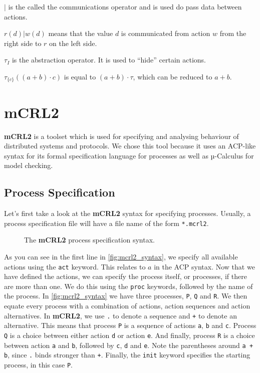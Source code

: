\documentclass{clseminar}
\begin{document}
  $|$ is the called the communications operator and is used do pass data between actions.
  \\
  \begin{example}
     $r(d) | w(d)$ means that the value $d$ is communicated from action $w$ from the right side to $r$ on the left side.
  \end{example}

  $\tau_I$ is the abstraction operator. It is used to “hide” certain actions.
  \\
  \begin{example}
    $\tau_{\{c\}}((a+b)\cdot c)$ is equal to $(a + b) \cdot \tau$, which can be reduced to $a + b$.
  \end{example}

  \section{mCRL2}

  \textbf{mCRL2} is a toolset which is used for specifying and analysing behaviour of distributed systems and protocols. We chose this tool because it uses an ACP-like syntax for its formal specification language for processes as well as µ-Calculus for model checking.

  \subsection{Process Specification}

  Let's first take a look at the \textbf{mCRL2} syntax for specifying processes. Usually, a process specification file will have a file name of the form \texttt{*.mcrl2}.

  \begin{figure}[!ht]
    
    \caption{The \textbf{mCRL2} process specification syntax.}
    \label{fig:mcrl2_syntax}
  \end{figure}

  As you can see in the first line in \autoref{fig:mcrl2_syntax}, we specify all available actions using the \texttt{act} keyword. This relates to $a$ in the ACP syntax. Now that we have defined the actions, we can specify the process itself, or processes, if there are more than one. We do this using the \texttt{proc} keywords, followed by the name of the process. In \autoref{fig:mcrl2_syntax} we have three processes, \texttt{P}, \texttt{Q} and \texttt{R}. We then equate every process with a combination of actions, action sequences and action alternatives. In \textbf{mCRL2}, we use \texttt{.} to denote a sequence and \texttt{+} to denote an alternative. This means that process \texttt{P} is a sequence of actions \texttt{a}, \texttt{b} and \texttt{c}. Process \texttt{Q} is a choice between either action \texttt{d} or action \texttt{e}. And finally, process \texttt{R} is a choice between action \texttt{a} and \texttt{b}, followed by \texttt{c}, \texttt{d} and \texttt{e}. Note the parentheses around \texttt{a + b}, since \texttt{.} binds stronger than \texttt{+}. Finally, the \texttt{init} keyword specifies the starting process, in this case \texttt{P}.
\end{document}
